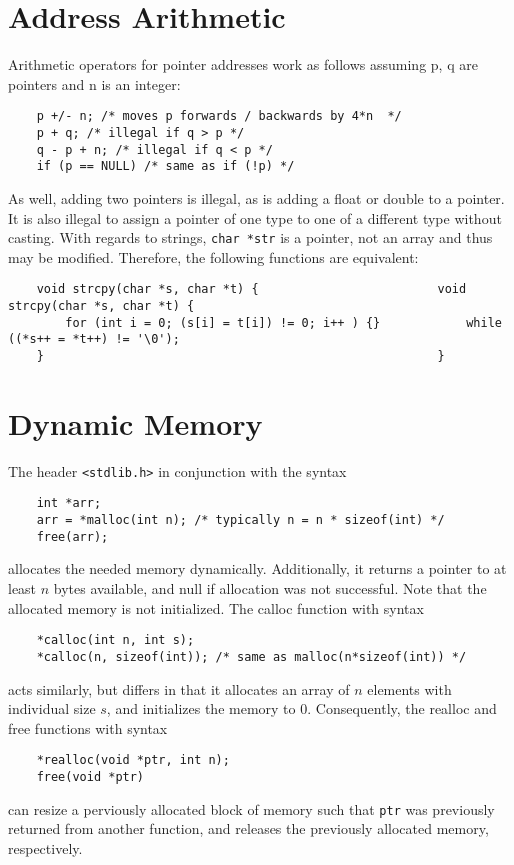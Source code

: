 \documentclass{tufte-book}
\begin{document}
\begin{fullwidth}
\section{Address Arithmetic}
Arithmetic operators for pointer addresses work as follows assuming p, q are pointers and n is an integer:
\begin{lstlisting}
    p +/- n; /* moves p forwards / backwards by 4*n  */
    p + q; /* illegal if q > p */
    q - p + n; /* illegal if q < p */
    if (p == NULL) /* same as if (!p) */
\end{lstlisting}
As well, adding two pointers is illegal, as is adding a float or double to a pointer. It is also illegal to assign a pointer of one type to one of a different type without casting. With regards to strings, \lstinline{char *str} is a pointer, not an array and thus may be modified. Therefore, the following functions are equivalent:
\begin{lstlisting}
    void strcpy(char *s, char *t) {                         void strcpy(char *s, char *t) {
        for (int i = 0; (s[i] = t[i]) != 0; i++ ) {}            while ((*s++ = *t++) != '\0');
    }                                                       }
\end{lstlisting}

\section{Dynamic Memory}
The header \lstinline{<stdlib.h>} in conjunction with the syntax
\begin{lstlisting}
    int *arr;
    arr = *malloc(int n); /* typically n = n * sizeof(int) */
    free(arr);
\end{lstlisting}
allocates the needed memory dynamically. Additionally, it returns a pointer to at least $n$ bytes available, and null if allocation was not successful. Note that the allocated memory is not initialized. The calloc function with syntax
\begin{lstlisting}
    *calloc(int n, int s);
    *calloc(n, sizeof(int)); /* same as malloc(n*sizeof(int)) */
\end{lstlisting}
acts similarly, but differs in that it allocates an array of $n$ elements with individual size $s$, and initializes the memory to 0. Consequently, the realloc and free functions with syntax
\begin{lstlisting}
    *realloc(void *ptr, int n);
    free(void *ptr)
\end{lstlisting}
can resize a perviously allocated block of memory such that \lstinline{ptr} was previously returned from another function, and releases the previously allocated memory, respectively.


\end{fullwidth}
\end{document}
